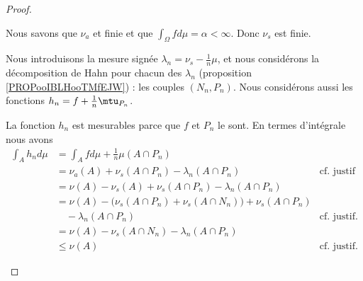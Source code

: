\begin{proof}
\begin{subproof}

		Nous savons que \( \nu_a\) et finie et que \( \int_{\Omega}fd\mu=\alpha<\infty\). Donc \( \nu_s\) est finie.

		\spitem[\( \nu_s\perp\mu\)]

		Nous introduisons la mesure signée \( \lambda_n=\nu_s-\frac{1}{  n}\mu\), et nous considérons la décomposition de Hahn pour chacun des \( \lambda_n\) (proposition \ref{PROPooIBLHooTMfEJW}) : les couples \( (N_n, P_n)\). Nous considérons aussi les fonctions \( h_n=f+\frac{1}{ n}\mtu_{P_n}\).

		\begin{subproof}
			\spitem[\( h_n\in \mH\)]
			La fonction \( h_n\) est mesurables parce que \( f\) et \( P_n\) le sont. En termes d'intégrale nous avons
			\begin{subequations}
				\begin{align}
					\int_Ah_nd\mu & =\int_Afd\mu +\frac{1}{ n}\mu(A\cap P_n)                                                                                                                                \\
					              & =\nu_a(A)+\nu_s(A\cap P_n)-\lambda_n(A\cap P_n)                                                                         & \text{cf. justif}		\label{SUBEQooAVCMooXXSXZO}  \\
					              & = \nu(A)-\nu_s(A)+\nu_s(A\cap P_n)-\lambda_n(A\cap P_n)                                                                                                                 \\
					              & =\nu(A)-\big( \nu_s(A\cap P_n)+\nu_s(A\cap N_n) \big)+\nu_s(A\cap P_n)                       \label{SUEQooUJUDooLFrBcR}                                                 \\
					              & \nonumber\quad-\lambda_n(A\cap P_n)                                                                                     & \text{cf. justif.}                            \\
					              & =\nu(A) -\nu_s(A\cap N_n)-\lambda_n(A\cap P_n)                                                                                                                          \\
					              & \leq \nu(A)                                                                                                             & \text{cf. justif.}		\label{SUBEQooACEXooWCHuag}

\end{align}
\end{subequations}
\end{subproof}
\end{subproof}
\end{proof}
